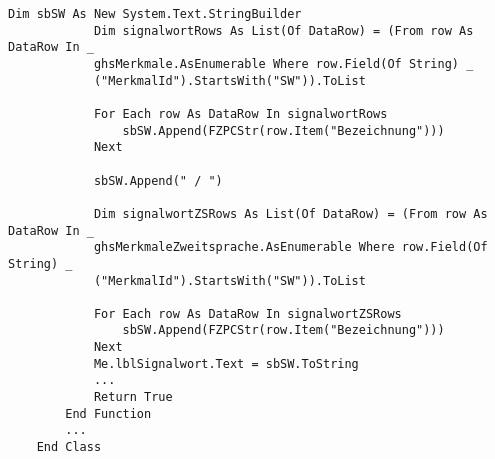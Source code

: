 \begin{lstlisting}[style=A, caption=Auszug Routine Etikettenerstellung (.NET),
label={code:etiketten}]
            Dim sbSW As New System.Text.StringBuilder
            Dim signalwortRows As List(Of DataRow) = (From row As DataRow In _
            ghsMerkmale.AsEnumerable Where row.Field(Of String) _ 
            ("MerkmalId").StartsWith("SW")).ToList
            
            For Each row As DataRow In signalwortRows
                sbSW.Append(FZPCStr(row.Item("Bezeichnung")))
            Next
    
            sbSW.Append(" / ")
    
            Dim signalwortZSRows As List(Of DataRow) = (From row As DataRow In _
            ghsMerkmaleZweitsprache.AsEnumerable Where row.Field(Of String) _
            ("MerkmalId").StartsWith("SW")).ToList
            
            For Each row As DataRow In signalwortZSRows
                sbSW.Append(FZPCStr(row.Item("Bezeichnung")))
            Next
            Me.lblSignalwort.Text = sbSW.ToString
            ...
            Return True
        End Function
        ...
    End Class
\end{lstlisting}
